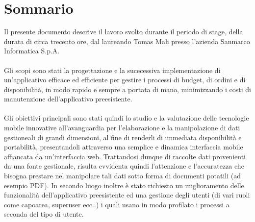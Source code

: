 
\cleardoublepage
{}
{}
\begingroup
\let\clearpage\relax
\let\cleardoublepage\relax
\let\cleardoublepage\relax

\chapter*{Sommario}

Il presente documento descrive il lavoro svolto durante il periodo di stage, della durata di circa trecento ore, dal laureando Tomas Mali presso l'azienda Sanmarco Informatica S.p.A.\\ \\
Gli scopi sono stati la progettazione e la sucecessiva implementazione di un'applicativo efficace ed efficiente per gestire i processi di budget, di ordini e di disponibilità, in modo rapido e sempre a portata di mano, minimizzando i costi di manutenzione dell'applicativo preesistente.\\ \\

Gli obiettivi principali sono stati quindi lo studio e la valutazione delle tecnologie mobile innovative all'avanguardia per l'elaborazione e la manipolazione di dati gestioneali di grandi dimensioni, al fine di renderli di immediata disponibilità e portabilità, presentandoli attraverso una semplice e dinamica interfaccia mobile affiancata da un'interfaccia web. Trattandosi dunque di raccolte dati provenienti da una fonte gestionale, risulta evvidenta quindi l'attenzione e l'accuratezza  che bisogna prestare nel manipolare tali dati sotto forma di documenti potatili (ad esempio PDF).
In secondo luogo inoltre è stato richiesto un miglioramento delle funzionalità dell'applicativo preesistente ed una gestione degli utenti (di vari ruoli come capoarea, superuser ecc..) i quali usano in modo profilato i processi a seconda del tipo di utente.

%
%

\endgroup			

\vfill

